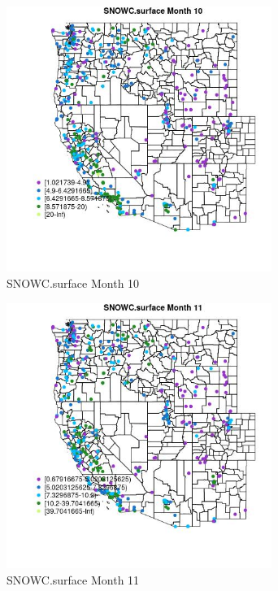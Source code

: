 \begin{figure} 
\centering  
\includegraphics[width=0.77\textwidth]{Code_Outputs/ML_input_report_ML_input_PM25_Step5_part_d_de_duplicated_aves_ML_input_MapObsMo10SNOWCsurface.jpg} 
\caption{\label{fig:ML_input_report_ML_input_PM25_Step5_part_d_de_duplicated_aves_ML_inputMapObsMo10SNOWCsurface}SNOWC.surface Month 10} 
\end{figure} 
 

\begin{figure} 
\centering  
\includegraphics[width=0.77\textwidth]{Code_Outputs/ML_input_report_ML_input_PM25_Step5_part_d_de_duplicated_aves_ML_input_MapObsMo11SNOWCsurface.jpg} 
\caption{\label{fig:ML_input_report_ML_input_PM25_Step5_part_d_de_duplicated_aves_ML_inputMapObsMo11SNOWCsurface}SNOWC.surface Month 11} 
\end{figure} 
 

